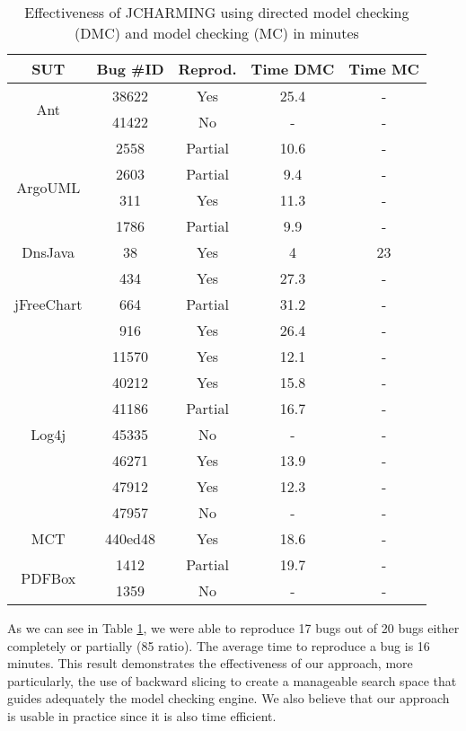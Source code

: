 \begin{table}[h!]
\centering
\begin{tabular}{c|c|c|c|c}
SUT                         & Bug \#ID & Reprod. & Time DMC & Time MC \\ \hline \hline
\multirow{2}{*}{Ant}        & 38622    & Yes     & 25.4     & -       \\
                            & 41422    & No      & -        & -       \\ \hline
\multirow{4}{*}{ArgoUML}    & 2558     & Partial & 10.6     & -       \\
                            & 2603     & Partial & 9.4      & -       \\
                            & 311      & Yes     & 11.3     & -       \\
                            & 1786     & Partial & 9.9      & -       \\  \hline
DnsJava                     & 38       & Yes     & 4        & 23      \\ \hline
\multirow{3}{*}{jFreeChart} & 434      & Yes     & 27.3     & -       \\
                            & 664      & Partial & 31.2     & -       \\
                            & 916      & Yes     & 26.4     & -       \\ \hline
\multirow{7}{*}{Log4j}      & 11570    & Yes     & 12.1     & -       \\
                            & 40212    & Yes     & 15.8     & -       \\
                            & 41186    & Partial & 16.7     & -       \\
                            & 45335    & No      & -        & -       \\
                            & 46271    & Yes     & 13.9    & -       \\
                            & 47912    & Yes     & 12.3     & -       \\
                            & 47957    & No      & -        & -       \\
MCT                         & 440ed48  & Yes     & 18.6     & -       \\ \hline
\multirow{2}{*}{PDFBox}     & 1412     & Partial & 19.7     & -       \\
                            & 1359     & No      & -        & - \\ \hline \hline
\end{tabular}

\caption{Effectiveness of JCHARMING using directed model checking (DMC) and model checking (MC) in minutes}
\label{tab:jcharming-results}
\end{table}

As we can see in Table \ref{tab:jcharming-results}, we were able to reproduce 17 bugs
out of 20 bugs either completely or partially (85%
ratio). The average time to reproduce a bug is 16 minutes.
This result demonstrates the effectiveness of our approach,
more particularly, the use of backward slicing to create a
manageable search space that guides adequately the model
checking engine. We also believe that our approach is usable
in practice since it is also time efficient.
